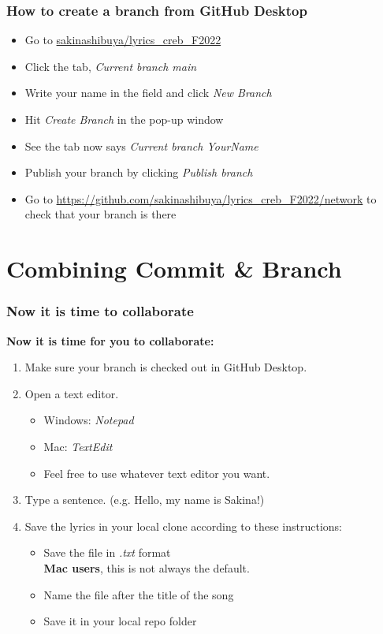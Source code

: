\documentclass[aspectratio=169]{beamer} %
\newcommand{\trainingURL}[1]{{\color{blue}\url{#1}}}
\newcommand{\traininerUsername}{sakinashibuya}
\newcommand{\repoName}{\traininerUsername/lyrics_creb_F2022}
\newcommand{\trainingRepoURL}[1]{\trainingURL{https://github.com/\repoName #1}}
\begin{document}
\begin{frame}
	\frametitle{How to create a branch from GitHub Desktop}
	
	\begin{itemize}
		\item Go to \url{\repoName}
		\item Click the tab, \textit{Current branch main}
		\item Write your name in the field and click \textit{New Branch}
		\item Hit \textit{Create Branch} in the pop-up window
		\item See the tab now says \textit{Current branch YourName}
		\item Publish your branch by clicking \textit{Publish branch}
		\item Go to \trainingRepoURL{/network} to check that your branch is there
	\end{itemize}
	
\end{frame}



\section{Combining Commit \& Branch}

\begin{frame}
\frametitle{Now it is time to collaborate}

\textbf{Now it is time for you to collaborate:}
\begin{enumerate}
	\item Make sure your branch is checked out in GitHub Desktop.
	\item Open a text editor. 
	\begin{itemize}
		\item Windows: \textit{Notepad}
		\item Mac: \textit{TextEdit}
		\item Feel free to use whatever text editor you want.
	\end{itemize}
	\item Type a sentence. (e.g. Hello, my name is Sakina!)
	\item Save the lyrics in your local clone according to these instructions:
	\begin{itemize}
		\item Save the file in \textit{.txt} format \\
		{\small \textbf{Mac users}, this is not always the default.}
		\item Name the file after the title of the song
		\item Save it in your local repo folder
	\end{itemize}
\end{enumerate}

\end{frame}
\end{document}
